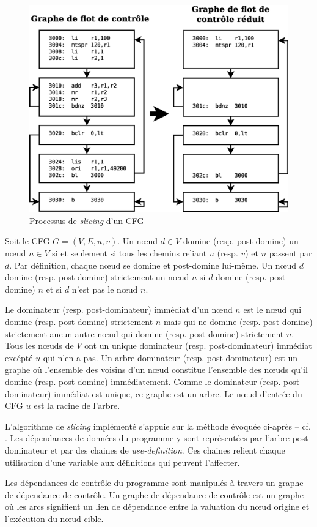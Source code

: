   \begin{figure}[ht]
    \centering
    \includegraphics[scale=0.3]{img/slicing.eps}
    \caption{Processus de \textit{slicing} d'un CFG}
    \label{fig:slicing}
  \end{figure}
    
  Soit le CFG $G = (V, E, u, v)$. Un n{\oe}ud $d \in V$ domine
  (resp. post-domine) un n{\oe}ud $n \in V$ si et seulement si tous les chemins
  reliant $u$ (resp. $v$) et $n$ passent par $d$. Par définition, chaque
  n{\oe}ud se domine et post-domine lui-même. Un n{\oe}ud $d$ domine
  (resp. post-domine) strictement un n{\oe}ud $n$ si $d$ domine
  (resp. post-domine) $n$ et si $d$ n'est pas le n{\oe}ud $n$.

  Le dominateur (resp. post-dominateur) immédiat d'un n{\oe}ud $n$ est le
  n{\oe}ud qui domine (resp. post-domine) strictement $n$ mais qui ne domine
  (resp. post-domine) strictement aucun autre n{\oe}ud qui domine
  (resp. post-domine) strictement $n$. Tous les n{\oe}uds de $V$ ont un unique
  dominateur (resp. post-dominateur) immédiat excépté $u$ qui n'en a pas. Un
  arbre dominateur (resp. post-dominateur) est un graphe où l'ensemble des
  voisins d'un n{\oe}ud constitue l'ensemble des n{\oe}uds qu'il domine
  (resp. post-domine) immédiatement. Comme le dominateur (resp. post-dominateur)
  immédiat est unique, ce graphe est un arbre. Le n{\oe}ud d'entrée du CFG $u$
  est la racine de l'arbre.

  \vspace{1em}
  
  L'algorithme de \textit{slicing} implémenté s'appuie sur la méthode
  évoquée ci-après -- cf. \cite{CF97}. Les dépendances de données du
  programme y sont représentées par l'arbre post-dominateur et par des
  chaines de \textit{use-definition}. Ces chaines relient chaque
  utilisation d'une variable aux définitions qui peuvent l'affecter.

  Les dépendances de contrôle du programme sont manipulés à travers un graphe de
  dépendance de contrôle. Un graphe de dépendance de contrôle est un graphe où
  les arcs signifient un lien de dépendance entre la valuation du n{\oe}ud origine
  et l'exécution du n{\oe}ud cible.
